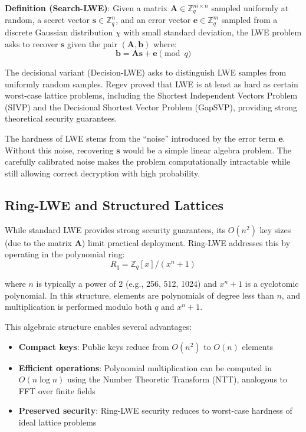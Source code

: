 \documentclass[11pt,a4paper]{article}
\begin{document}
\textbf{Definition (Search-LWE)}: Given a matrix $\mathbf{A} \in \mathbb{Z}_q^{m \times n}$ sampled uniformly at random, a secret vector $\mathbf{s} \in \mathbb{Z}_q^n$, and an error vector $\mathbf{e} \in \mathbb{Z}_q^m$ sampled from a discrete Gaussian distribution $\chi$ with small standard deviation, the LWE problem asks to recover $\mathbf{s}$ given the pair $(\mathbf{A}, \mathbf{b})$ where:
\begin{equation}
    \mathbf{b} = \mathbf{A}\mathbf{s} + \mathbf{e} \pmod{q}
\end{equation}

The decisional variant (Decision-LWE) asks to distinguish LWE samples from uniformly random samples. Regev proved that LWE is at least as hard as certain worst-case lattice problems, including the Shortest Independent Vectors Problem (SIVP) and the Decisional Shortest Vector Problem (GapSVP), providing strong theoretical security guarantees.

The hardness of LWE stems from the ``noise'' introduced by the error term $\mathbf{e}$. Without this noise, recovering $\mathbf{s}$ would be a simple linear algebra problem. The carefully calibrated noise makes the problem computationally intractable while still allowing correct decryption with high probability.

\subsection{Ring-LWE and Structured Lattices}

While standard LWE provides strong security guarantees, its $O(n^2)$ key sizes (due to the matrix $\mathbf{A}$) limit practical deployment. Ring-LWE \cite{lyubashevsky2010} addresses this by operating in the polynomial ring:
\begin{equation}
    R_q = \mathbb{Z}_q[x]/(x^n + 1)
\end{equation}

where $n$ is typically a power of 2 (e.g., 256, 512, 1024) and $x^n + 1$ is a cyclotomic polynomial. In this structure, elements are polynomials of degree less than $n$, and multiplication is performed modulo both $q$ and $x^n + 1$.

This algebraic structure enables several advantages:
\begin{itemize}
    \item \textbf{Compact keys}: Public keys reduce from $O(n^2)$ to $O(n)$ elements
    \item \textbf{Efficient operations}: Polynomial multiplication can be computed in $O(n \log n)$ using the Number Theoretic Transform (NTT), analogous to FFT over finite fields
    \item \textbf{Preserved security}: Ring-LWE security reduces to worst-case hardness of ideal lattice problems
\end{itemize}
\end{document}
